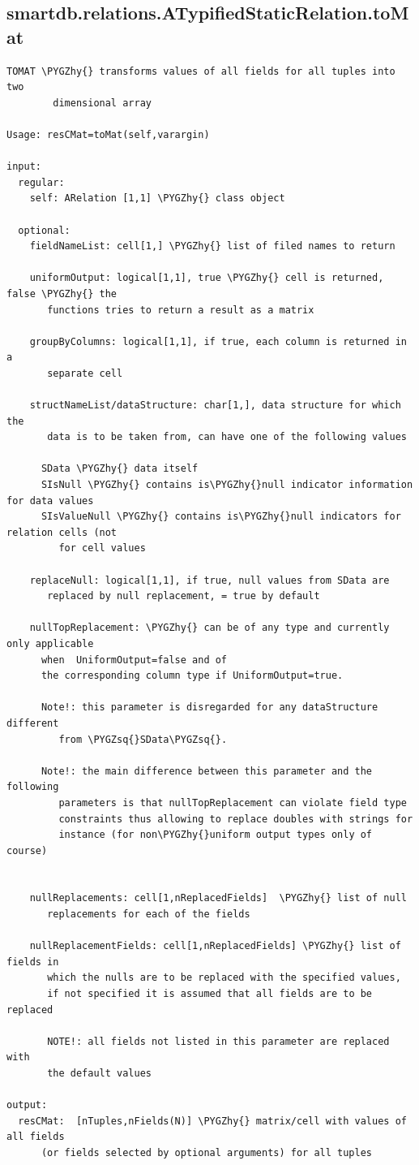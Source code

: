 \documentclass[letterpaper,10pt,english]{sphinxmanual}
\def\PYGZhy{\char`\-}
\def\PYGZsq{\char`\'}
\begin{document}
\subsection{smartdb.relations.ATypifiedStaticRelation.toMat}
\label{chap_functions:smartdb-relations-atypifiedstaticrelation-tomat}
\begin{Verbatim}[commandchars=\\\{\}]
TOMAT \PYGZhy{} transforms values of all fields for all tuples into two
        dimensional array

Usage: resCMat=toMat(self,varargin)

input:
  regular:
    self: ARelation [1,1] \PYGZhy{} class object

  optional:
    fieldNameList: cell[1,] \PYGZhy{} list of filed names to return

    uniformOutput: logical[1,1], true \PYGZhy{} cell is returned, false \PYGZhy{} the
       functions tries to return a result as a matrix

    groupByColumns: logical[1,1], if true, each column is returned in a
       separate cell

    structNameList/dataStructure: char[1,], data structure for which the
       data is to be taken from, can have one of the following values

      SData \PYGZhy{} data itself
      SIsNull \PYGZhy{} contains is\PYGZhy{}null indicator information for data values
      SIsValueNull \PYGZhy{} contains is\PYGZhy{}null indicators for relation cells (not
         for cell values

    replaceNull: logical[1,1], if true, null values from SData are
       replaced by null replacement, = true by default

    nullTopReplacement: \PYGZhy{} can be of any type and currently only applicable
      when  UniformOutput=false and of
      the corresponding column type if UniformOutput=true.

      Note!: this parameter is disregarded for any dataStructure different
         from \PYGZsq{}SData\PYGZsq{}.

      Note!: the main difference between this parameter and the following
         parameters is that nullTopReplacement can violate field type
         constraints thus allowing to replace doubles with strings for
         instance (for non\PYGZhy{}uniform output types only of course)


    nullReplacements: cell[1,nReplacedFields]  \PYGZhy{} list of null
       replacements for each of the fields

    nullReplacementFields: cell[1,nReplacedFields] \PYGZhy{} list of fields in
       which the nulls are to be replaced with the specified values,
       if not specified it is assumed that all fields are to be replaced

       NOTE!: all fields not listed in this parameter are replaced with
       the default values

output:
  resCMat:  [nTuples,nFields(N)] \PYGZhy{} matrix/cell with values of all fields
      (or fields selected by optional arguments) for all tuples
\end{Verbatim}
\end{document}
